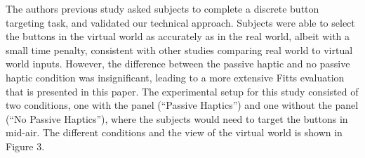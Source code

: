 \documentclass[]{aiaa-tc}%
\begin{document}
The authors previous study\cite{joyce_rapidly_2015} asked subjects to complete a discrete button targeting task, and validated our technical approach.
Subjects were able to select the buttons in the virtual world as accurately as in the real world, albeit with a small time penalty, consistent with other studies comparing real world to virtual world inputs\cite{liu_comparing_2009}.
However, the difference between the passive haptic and no passive haptic condition was insignificant, leading to a more extensive Fitts evaluation that is presented in this paper.
The experimental setup for this study consisted of two conditions, one with the panel (``Passive Haptics'') and one without the panel (``No Passive Haptics''), where the subjects would need to target the buttons in mid-air.
The different conditions and the view of the virtual world is shown in Figure 3.
\end{document}
